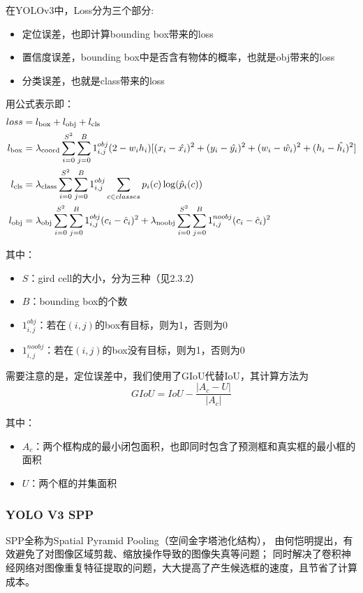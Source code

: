 \documentclass[UTF8]{ctexart}
\begin{document}
在YOLOv3中，Loss分为三个部分:
\begin{itemize}
    \item 定位误差，也即计算bounding box带来的loss
    \item 置信度误差，bounding box中是否含有物体的概率，也就是obj带来的loss
    \item 分类误差，也就是class带来的loss
\end{itemize}

用公式表示即：
$$\begin{aligned}
    loss &= l_{\rm box} + l_{\rm obj} + l_{\rm cls} \\
    l_{\rm box} &= \lambda_{\rm coord}\sum_{i=0}^{S^2}
    \sum_{j=0}^{B}1_{i,j}^{obj}(2-w_ih_i)
    [(x_i-\hat{x_i})^2+(y_i-\hat{y_i})^2+(w_i-\hat{w_i})^2+(h_i-\hat{h_i})^2] \\
    l_{\rm cls} &= \lambda_{\rm class}\sum_{i=0}^{S^2}
    \sum_{j=0}^{B}1_{i,j}^{obj}\sum_{c\in classes}p_i(c)\log(\hat{p}_i(c)) \\
    l_{\rm obj}&= \lambda_{\rm obj}\sum_{i=0}^{S^2}
    \sum_{j=0}^{B}1_{i,j}^{obj}(c_i-\hat{c}_i)^2+
    \lambda_{\rm noobj}\sum_{i=0}^{S^2}
    \sum_{j=0}^{B}1_{i,j}^{noobj}(c_i-\hat{c}_i)^2
\end{aligned}$$

其中：
\begin{itemize}
    \item $S$：gird cell的大小，分为三种（见2.3.2）
    \item $B$：bounding box的个数
    \item $1_{i,j}^{obj}$：若在$(i,j)$的box有目标，则为1，否则为0
    \item $1_{i,j}^{noobj}$：若在$(i,j)$的box没有目标，则为1，否则为0
\end{itemize}

需要注意的是，定位误差中，我们使用了GIoU代替IoU，其计算方法为
$$GIoU=IoU-\dfrac{|A_c-U|}{|A_c|}$$

其中：
\begin{itemize}
    \item $A_c$：两个框构成的最小闭包面积，也即同时包含了预测框和真实框的最小框的面积
    \item $U$：两个框的并集面积
\end{itemize}

\subsubsection{YOLO V3 SPP}

SPP全称为Spatial Pyramid Pooling（空间金字塔池化结构），
由何恺明提出，有效避免了对图像区域剪裁、缩放操作导致的图像失真等问题；
同时解决了卷积神经网络对图像重复特征提取的问题，大大提高了产生候选框的速度，且节省了计算成本。
\end{document}
